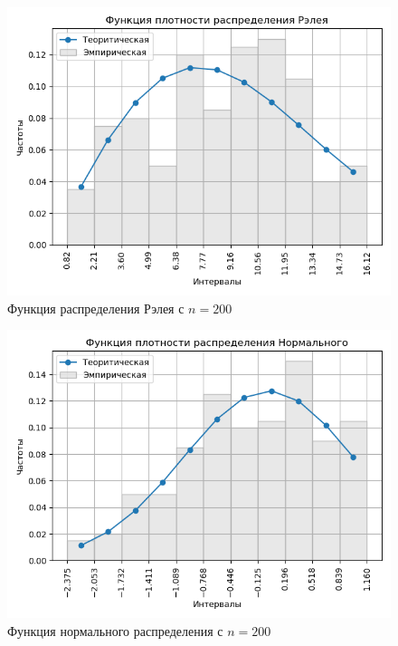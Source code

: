 \documentclass[a4]{article}
\begin{document}
\begin{center}
\begin{figure}[H]
\caption{Функция распределения Рэлея с $ n = 200$}
\includegraphics[width=\textwidth]{output/task2/rayleigh_200_histogram.png}
\end{figure}

\begin{figure}[H]
\caption{Функция нормального распределения с $ n = 200$}
\includegraphics[width=\textwidth]{output/task2/norm_200_histogram.png}
\end{figure}



\end{center}
\end{document}
